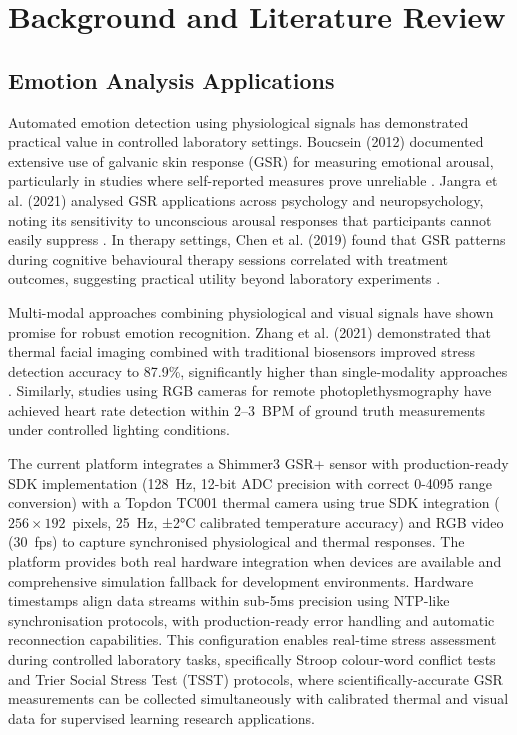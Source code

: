 \documentclass{report}
\begin{document}
    \chapter{Background and Literature Review}
    \label{ch:background}


    \section{Emotion Analysis Applications}
    \label{sec:emotion_apps}

    Automated emotion detection using physiological signals has demonstrated practical value in controlled laboratory settings. Boucsein (2012) documented extensive use of galvanic skin response (GSR) for measuring emotional arousal, particularly in studies where self-reported measures prove unreliable \cite{boucsein2012}. Jangra et al. (2021) analysed GSR applications across psychology and neuropsychology, noting its sensitivity to unconscious arousal responses that participants cannot easily suppress \cite{jangra2021}. In therapy settings, Chen et al. (2019) found that GSR patterns during cognitive behavioural therapy sessions correlated with treatment outcomes, suggesting practical utility beyond laboratory experiments \cite{chen2019}.

    Multi-modal approaches combining physiological and visual signals have shown promise for robust emotion recognition. Zhang et al. (2021) demonstrated that thermal facial imaging combined with traditional biosensors improved stress detection accuracy to 87.9\%, significantly higher than single-modality approaches \cite{zhang2021}. Similarly, studies using RGB cameras for remote photoplethysmography have achieved heart rate detection within $2$--$3$~BPM of ground truth measurements under controlled lighting conditions.

    The current platform integrates a Shimmer3 GSR+ sensor with production-ready SDK implementation (128~Hz, 12-bit ADC precision with correct 0-4095 range conversion) with a Topdon TC001 thermal camera using true SDK integration ($256 \times 192$~pixels, 25~Hz, ±2°C calibrated temperature accuracy) and RGB video (30~fps) to capture synchronised physiological and thermal responses. The platform provides both real hardware integration when devices are available and comprehensive simulation fallback for development environments. Hardware timestamps align data streams within sub-5ms precision using NTP-like synchronisation protocols, with production-ready error handling and automatic reconnection capabilities. This configuration enables real-time stress assessment during controlled laboratory tasks, specifically Stroop colour-word conflict tests and Trier Social Stress Test (TSST) protocols, where scientifically-accurate GSR measurements can be collected simultaneously with calibrated thermal and visual data for supervised learning research applications.
\end{document}
